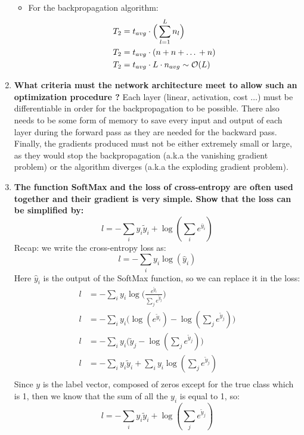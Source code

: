 \documentclass[12pt,a4paper]{article}
\begin{document}
\begin{enumerate}[resume]
\begin{itemize}
        \item For the backpropagation algorithm:  
        \begin{align*}
            T_2 &= t_{avg} \cdot \Big(\sum_{l=1}^L n_l\Big) \\
            T_2 &= t_{avg} \cdot (n + n + \text{\dots} + n) \\
            T_2 &= t_{avg} \cdot L \cdot n_{avg}  \sim \mathcal{O}(L)
        \end{align*}

    \end{itemize}

    \item \textbf{What criteria must the network architecture meet to allow such an optimization procedure ?} \newline
    Each layer (linear, activation, cost $\dots$) must be differentiable in order for the backpropagation to be possible.
    There also needs to be some form of memory to save every input and output of each layer during the forward pass as they are
    needed for the backward pass. Finally, the gradients produced must not be either extremely small or large, as they would stop
    the backpropagation (a.k.a the vanishing gradient problem) or the algorithm diverges (a.k.a the exploding gradient problem).

    \item \textbf{The function SoftMax and the loss of cross-entropy are often used together and their gradient is very simple. Show that the loss can be simpliﬁed by:
    $$ l = - \sum_{i}y_i \tilde{y}_i + \log (\sum_{i} e^{\bar{y}_i}) $$} \newline
    Recap: we write the cross-entropy loss as:
    \[
    l = - \sum_{i} y_i \log(\hat{y}_i)
    \]
    Here $\hat{y}_i$ is the output of the SoftMax function, so we can replace it in the loss:
    \begin{align*}
    l &= - \sum_{i} y_i \log\Big(\frac{e^{\tilde{y}_i}}{\sum_{j} e^{\tilde{y}_j}}\Big) \\
    l &= - \sum_{i} y_i \Big(\log(e^{\tilde{y}_i}) - \log(\sum_{j} e^{\tilde{y}_j})\Big) \\
    l &= - \sum_{i} y_i \Big(\tilde{y}_j - \log(\sum_{j} e^{\tilde{y}_j})\Big) \\
    l &= - \sum_{i} y_i \tilde{y}_i + \sum_{i} y_i \log(\sum_{j} e^{\tilde{y}_j}) \\
    \end{align*}
    Since $y$ is the label vector, composed of zeros except for the true class which is 1, then we know that the sum of all the $y_i$ is equal to 1, so:
    \[
    l = - \sum_{i} y_i \tilde{y}_i + \log(\sum_{j} e^{\tilde{y}_j})
    \]


\end{enumerate}
\end{document}
